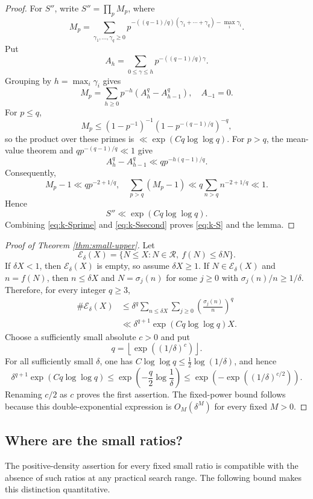 \documentclass[11pt,letterpaper,reqno]{amsart}
\numberwithin{equation}{section}
\theoremstyle{remark}
\newcommand{\Rcal}{\mathcal{R}}
\newcommand{\1}{\mathbf 1}
\renewcommand{\leq}{\leqslant}
\renewcommand{\geq}{\geqslant}
\begin{document}
\begin{proof}
For $S''$, write $S''=\prod_pM_p$, where
\[
 M_p=\sum_{\gamma_1,\ldots,\gamma_q\geq0}
 p^{-((q-1)/q)(\gamma_1+\cdots+\gamma_q)-\max_i\gamma_i}.
\]
Put
\[
 A_h=\sum_{0\leq\gamma\leq h}p^{-((q-1)/q)\gamma}.
\]
Grouping by $h=\max_i\gamma_i$ gives
\[
 M_p=\sum_{h\geq0}p^{-h}(A_h^q-A_{h-1}^q),\quad A_{-1}=0.
\]
For $p\leq q$,
\[
 M_p\leq(1-p^{-1})^{-1}(1-p^{-(q-1)/q})^{-q},
\]
so the product over these primes is $\ll\exp(Cq\log\log q)$. For $p>q$,
the mean-value theorem and $qp^{-(q-1)/q}\ll1$ give
\[
 A_h^q-A_{h-1}^q\ll q p^{-h(q-1)/q}.
\]
Consequently,
\[
 M_p-1\ll q p^{-2+1/q},
\quad
 \sum_{p>q}(M_p-1)\ll q\sum_{n>q}n^{-2+1/q}\ll1.
\]
Hence
\begin{equation}\label{eq:k-Ssecond}
 S''\ll\exp(Cq\log\log q).
\end{equation}
Combining \eqref{eq:k-Sprime} and \eqref{eq:k-Ssecond} proves
\eqref{eq:k-S} and the lemma.
\end{proof}

\begin{proof}[Proof of Theorem \ref{thm:small-upper}]
Let
\[
 \mathcal{E}_\delta(X)=
 \{N\leq X:N\in\Rcal,\ f(N)\leq\delta N\}.
\]
If $\delta X<1$, then $\mathcal{E}_\delta(X)$ is empty, so assume
$\delta X\geq1$. If $N\in\mathcal{E}_\delta(X)$ and $n=f(N)$, then
$n\leq\delta X$ and $N=\sigma_j(n)$ for some $j\geq0$ with
$\sigma_j(n)/n\geq1/\delta$. Therefore, for every integer $q\geq3$,
\begin{align*}
 \#\mathcal{E}_\delta(X)
 &\leq\delta^q\sum_{n\leq\delta X}\sum_{j\geq0}
 \left(\frac{\sigma_j(n)}n\right)^q\\
 &\ll\delta^{q+1}\exp(Cq\log\log q)X.
\end{align*}
Choose a sufficiently small absolute $c>0$ and put
\[
 q=\left\lfloor\exp((1/\delta)^c)\right\rfloor.
\]
For all sufficiently small $\delta$, one has
$C\log\log q\leq\tfrac12\log(1/\delta)$, and hence
\[
 \delta^{q+1}\exp(Cq\log\log q)
 \leq\exp\!\left(-\frac q2\log\frac1\delta\right)
 \leq\exp\!\left(-\exp((1/\delta)^{c/2})\right).
\]
Renaming $c/2$ as $c$ proves the first assertion. The fixed-power bound
follows because this double-exponential expression is $O_M(\delta^M)$ for
every fixed $M>0$.
\end{proof}

\subsection{Where are the small ratios?}

The positive-density assertion for every fixed small ratio is compatible
with the absence of such ratios at any practical search range. The
following bound makes this distinction quantitative.
\end{document}
